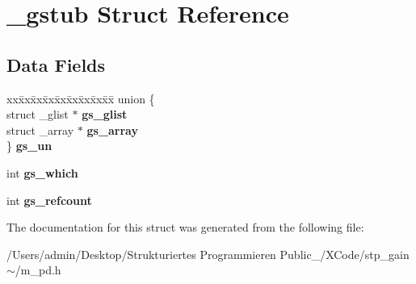 \hypertarget{struct__gstub}{}\section{\+\_\+gstub Struct Reference}
\label{struct__gstub}
\subsection*{Data Fields}
\begin{DoxyCompactItemize}
\item 
\mbox{\label{struct__gstub_aeeede2ed14f8f20de4feccc83881ee1d}} 
\begin{tabbing}
xx\=xx\=xx\=xx\=xx\=xx\=xx\=xx\=xx\=\kill
union \{\\
\>struct \_glist $\ast$ {\bfseries gs\_glist}\\
\>struct \_array $\ast$ {\bfseries gs\_array}\\
\} {\bfseries gs\_un}\\

\end{tabbing}\item 
\mbox{\label{struct__gstub_ab3ad08cf539f7263da92d9b3cdce1cf9}} 
int {\bfseries gs\+\_\+which}
\item 
\mbox{\label{struct__gstub_acf5f57a388b6ac9be25e1eca6715253b}} 
int {\bfseries gs\+\_\+refcount}
\end{DoxyCompactItemize}


The documentation for this struct was generated from the following file\+:\begin{DoxyCompactItemize}
\item 
/\+Users/admin/\+Desktop/\+Strukturiertes Programmieren Public\+\_/\+X\+Code/stp\+\_\+gain$\sim$/m\+\_\+pd.\+h\end{DoxyCompactItemize}
